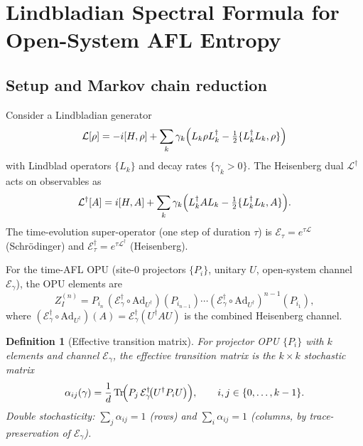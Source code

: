 \documentclass[12pt,a4paper]{article}
\newtheorem{definition}[theorem]{Definition}
\begin{document}
\section{Lindbladian Spectral Formula for Open-System AFL Entropy}
\label{sec:lind_spectral}

\subsection{Setup and Markov chain reduction}

Consider a Lindbladian generator
\[
  \mathcal{L}[\rho]
  = -i[H,\rho]
    + \sum_k \gamma_k
      \Bigl(L_k\rho L_k^\dagger - \tfrac12\{L_k^\dagger L_k,\rho\}\Bigr)
\]
with Lindblad operators $\{L_k\}$ and decay rates $\{\gamma_k>0\}$.
The Heisenberg dual $\mathcal{L}^\dagger$ acts on observables as
\[
  \mathcal{L}^\dagger[A]
  = i[H,A]
    + \sum_k \gamma_k
      \Bigl(L_k^\dagger A L_k - \tfrac12\{L_k^\dagger L_k,A\}\Bigr).
\]
The time-evolution super-operator (one step of duration $\tau$) is
$\mathcal{E}_\tau = e^{\tau\mathcal{L}}$ (Schr\"odinger) and
$\mathcal{E}_\tau^\dagger = e^{\tau\mathcal{L}^\dagger}$ (Heisenberg).

For the time-AFL OPU (site-$0$ projectors $\{P_i\}$, unitary $U$,
open-system channel $\mathcal{E}_\gamma$), the OPU elements are
\[
  Z^{(n)}_I
  = P_{i_n}\,(\mathcal{E}_\gamma^\dagger \circ \mathrm{Ad}_{U^\dagger})
    (P_{i_{n-1}})\cdots
    (\mathcal{E}_\gamma^\dagger \circ \mathrm{Ad}_{U^\dagger})^{n-1}(P_{i_1}),
\]
where $(\mathcal{E}_\gamma^\dagger \circ \mathrm{Ad}_{U^\dagger})(A)
= \mathcal{E}_\gamma^\dagger(U^\dagger A U)$ is the combined Heisenberg channel.

\begin{definition}[Effective transition matrix]
\label{def:transition_matrix}
For projector OPU $\{P_i\}$ with $k$ elements and channel $\mathcal{E}_\gamma$,
the \emph{effective transition matrix} is the $k\times k$ stochastic matrix
\[
  \alpha_{ij}(\gamma)
  = \frac{1}{d}\,\mathrm{Tr}\!\Bigl(P_j\,
    \mathcal{E}_\gamma^\dagger\!\bigl(U^\dagger P_i U\bigr)\Bigr),
  \qquad i,j \in \{0,\ldots,k-1\}.
\]
Double stochasticity: $\sum_j \alpha_{ij}=1$ (rows) and $\sum_i\alpha_{ij}=1$ (columns,
by trace-preservation of $\mathcal{E}_\gamma$).
\end{definition}
\end{document}
